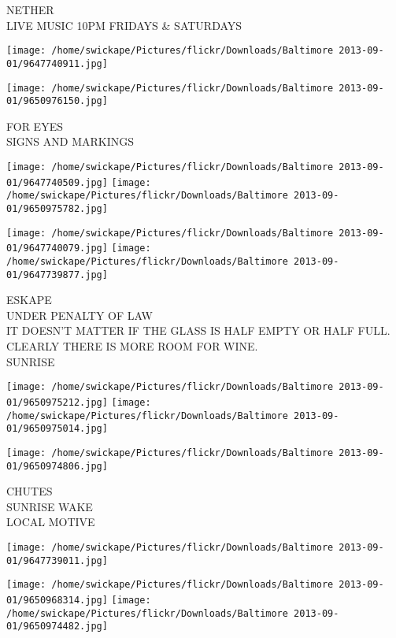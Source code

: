 \documentclass[10pt,letterpaper]{article}
\begin{document}
NETHER\\
LIVE MUSIC 10PM FRIDAYS \& SATURDAYS\\
\pagebreak

\texttt{[image: /home/swickape/Pictures/flickr/Downloads/Baltimore 2013-09-01/9647740911.jpg]}

\vspace{0.25in}
\texttt{[image: /home/swickape/Pictures/flickr/Downloads/Baltimore 2013-09-01/9650976150.jpg]}

FOR EYES\\
SIGNS AND MARKINGS\\
\pagebreak

\texttt{[image: /home/swickape/Pictures/flickr/Downloads/Baltimore 2013-09-01/9647740509.jpg]}
\texttt{[image: /home/swickape/Pictures/flickr/Downloads/Baltimore 2013-09-01/9650975782.jpg]}

\texttt{[image: /home/swickape/Pictures/flickr/Downloads/Baltimore 2013-09-01/9647740079.jpg]}
\texttt{[image: /home/swickape/Pictures/flickr/Downloads/Baltimore 2013-09-01/9647739877.jpg]}

ESKAPE\\
UNDER PENALTY OF LAW\\
IT DOESN'T MATTER IF THE GLASS IS HALF EMPTY OR HALF FULL.  CLEARLY THERE IS MORE ROOM FOR WINE.\\
SUNRISE\\
\pagebreak

\texttt{[image: /home/swickape/Pictures/flickr/Downloads/Baltimore 2013-09-01/9650975212.jpg]}
\texttt{[image: /home/swickape/Pictures/flickr/Downloads/Baltimore 2013-09-01/9650975014.jpg]}

\texttt{[image: /home/swickape/Pictures/flickr/Downloads/Baltimore 2013-09-01/9650974806.jpg]}

CHUTES\\
SUNRISE WAKE\\
LOCAL MOTIVE\\
\pagebreak

\texttt{[image: /home/swickape/Pictures/flickr/Downloads/Baltimore 2013-09-01/9647739011.jpg]}

\vspace{0.25in}
\texttt{[image: /home/swickape/Pictures/flickr/Downloads/Baltimore 2013-09-01/9650968314.jpg]}
\texttt{[image: /home/swickape/Pictures/flickr/Downloads/Baltimore 2013-09-01/9650974482.jpg]}
\end{document}
